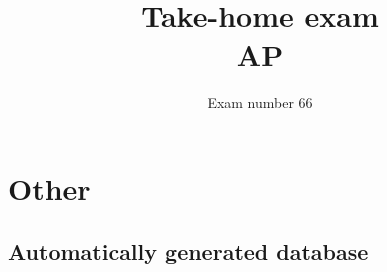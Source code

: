 \documentclass[12pt,a4paper]{article}
\begin{document}
\title{%
  Take-home exam \\
  AP
}%
\author{Exam number 66}

\maketitle
\thispagestyle{empty}
\newpage
\setcounter{page}{1}





\newpage
\appendix
%  
%
%  
%  
%  
%  
%  

\section{Other}
\subsection{Automatically generated database}\label{app:gendb}

\end{document}
